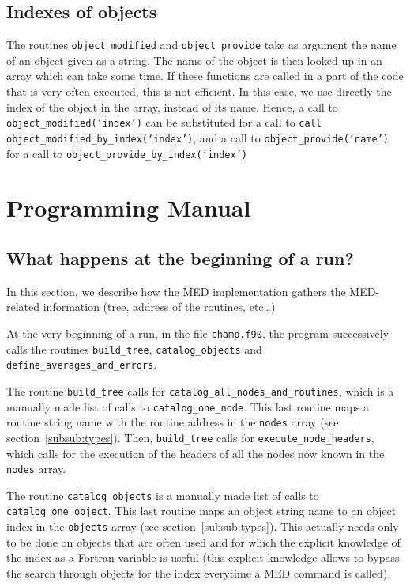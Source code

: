 \documentclass[a4paper,11pt]{article}
\begin{document}
\subsection{Indexes of objects}
The routines {\tt object_modified} and {\tt object_provide} take as argument the name of an object given as a string. The name of the object is then looked up in an array which can take some time. If these functions are called in a part of the code that is very often executed, this is not efficient. In this case, we use directly the index of the object in the array, instead of its name.
Hence, a call to {\tt object_modified(`index')} can be substituted for a call to {\tt call object_modified_by_index(`index')}, and a call to {\tt object_provide(`name')} for a call to {\tt object_provide_by_index(`index')}


\section{Programming Manual}

\subsection{What happens at the beginning of a run?}
\label{sub:begin}

In this section, we describe how the MED implementation gathers the MED-related information (tree, address of the routines, etc\dots)

At the very beginning of a run, in the file {\tt champ.f90}, the program successively calls the routines {\tt build_tree}, {\tt catalog_objects} and {\tt define_averages_and_errors}.

The routine {\tt build_tree} calls for {\tt catalog_all_nodes_and_routines}, which is a manually made list of calls to {\tt catalog_one_node}. This last routine maps a routine string name with the routine address in the {\tt nodes} array (see section~\ref{subsub:types}). Then, {\tt build_tree} calls for {\tt execute_node_headers}, which calls for the execution of the headers of all the nodes now known in the {\tt nodes} array.

The routine {\tt catalog_objects} is a manually made list of calls to {\tt catalog_one_object}. This last routine maps an object string name to an object index in the {\tt objects} array (see section~\ref{subsub:types}). This actually needs only to be done on objects that are often used and for which the explicit knowledge of the index as a Fortran variable is useful (this explicit knowledge allows to bypass the search through objects for the index everytime a MED command is called).
\end{document}
